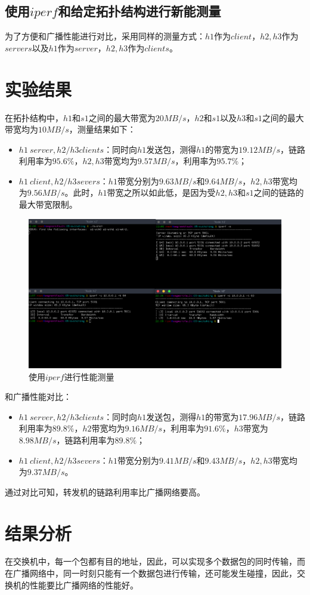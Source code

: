 \documentclass[UTF8,noindent]{ctexart}
\begin{document}
\subsection*{使用$iperf$和给定拓扑结构进行新能测量}
为了方便和广播性能进行对比，采用同样的测量方式：$h1$作为$client$，$h2,h3$作为$servers$以及$h1$作为$server$，$h2,h3$作为$clients$。
\section*{{实验结果}}
在拓扑结构中，$h1$和$s1$之间的最大带宽为$20MB/s$，$h2$和$s1$以及$h3$和$s1$之间的最大带宽均为$10MB/s$，测量结果如下：
\begin{itemize}
  \item $h1\ server, h2/h3 clients$：同时向$h1$发送包，测得$h1$的带宽为$19.12MB/s$，链路利用率为$95.6\%$，$h2,h3$带宽均为$9.57MB/s$，利用率为$95.7\%$；
  \item $h1\ client, h2/h3 severs$：$h1$带宽分别为$9.63MB/s$和$9.64MB/s$，$h2,h3$带宽均为$9.56MB/s$。此时，$h1$带宽之所以如此低，是因为受$h2,h3$和$s1$之间的链路的最大带宽限制。
\end{itemize}

\begin{figure}[H]
  \centering
  \includegraphics[scale=0.3]{1.png}
  \caption{使用$iperf$进行性能测量}
\end{figure}

和广播性能对比：
\begin{itemize}
  \item $h1\ server, h2/h3 clients$：同时向$h1$发送包，测得$h1$的带宽为$17.96MB/s$，链路利用率为$89.8\%$，$h2$带宽均为$9.16MB/s$，利用率为$91.6\%$，$h3$带宽为$8.98MB/s$，链路利用率为$89.8\%$；
  \item $h1\ client, h2/h3 severs$：$h1$带宽分别为$9.41MB/s$和$9.43MB/s$，$h2,h3$带宽均为$9.37MB/s$。
\end{itemize}

通过对比可知，转发机的链路利用率比广播网络要高。

		\section*{{结果分析}}
		在交换机中，每一个包都有目的地址，因此，可以实现多个数据包的同时传输，而在广播网络中，同一时刻只能有一个数据包进行传输，还可能发生碰撞，因此，交换机的性能要比广播网络的性能好。
			
\end{document}
